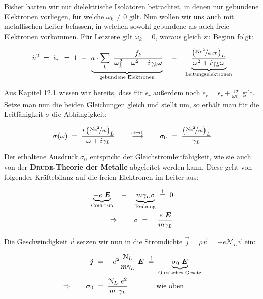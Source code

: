 Bisher hatten wir nur dielektrische Isolatoren betrachtet, in denen nur gebundene Elektronen vorliegen, für welche $\omega_k \neq 0$ gilt. Nun wollen wir uns auch mit metallischen Leiter befassen, in welchen sowohl gebundene als auch freie Elektronen vorkommen. Für Letztere gilt $\omega_k = 0$, woraus gleich zu Beginn folgt:

\begin{equation*}
\tilde{n}^2  \ = \ \tilde{\epsilon}_r  \ = \ 1 \ + \ \underbrace{a\cdot\sum_k \ \frac{f_k}{\omega_k^2 - \omega^2 - i \gamma_k\omega}}_{\text{gebundene Elektronen}} \quad - \quad \underbrace{\frac{\left(\nicefrac{\mathcal{N}e^2}{\epsilon_0m}\right)_L}{\omega^2 + i\gamma_L\omega}}_{\text{Leitungselektronen}}
\end{equation*}

Aus Kapitel 12.1 wissen wir bereits, dass für $\tilde{\epsilon}_r$ außerdem noch $\tilde{\epsilon}_r = \epsilon_r + \frac{i\sigma}{\omega\epsilon_0}$ gilt. Setze man nun die beiden Gleichungen gleich und stellt um, so erhält man für die Leitfähigkeit $\sigma$ die Abhängigkeit:

\begin{equation*}
\sigma(\omega) \ = \ \frac{i\left(\nicefrac{\mathcal{N}e^2}{m}\right)_L}{\omega + i \gamma_L} \qquad \overset{\omega\rightarrow0}{\longrightarrow}\qquad \sigma_0  \ = \ \frac{\left(\nicefrac{\mathcal{N}e^2}{m}\right)_L}{\gamma_L}	
\end{equation*}

Der erhaltene Ausdruck $\sigma_0$ entspricht der Gleichstromleitfähigkeit, wie sie auch von der \textbf{\textsc{Drude}-Theorie der Metalle} abgeleitet werden kann. Diese geht von folgender Kräftebilanz auf die freien Elektronen im Leiter aus:

\begin{align*}
\underbrace{-e\ \vec{E}}_{\textsc{Coulomb}} \quad - \quad \underbrace{m \gamma_L\vec{v}}_{\text{Reibung}}  \ \overset{!}{=} \ 0\\
\Rightarrow \qquad \vec{v}  \ = \  -\frac{e \ \vec{E}}{m \gamma_L} 
\end{align*}

Die Geschwindigkeit $\vec{v}$ setzen wir nun in die Stromdichte $\vec{j} = \rho\vec{v} = -e \mathcal{N}_L \vec{v}$ ein:

\begin{align*}
\vec{j}  \ &= \ -e^2 \frac{\mathcal{N}_L}{m\gamma_L} \ \vec{E} \ \overset{!}{=} \ \underbrace{\sigma_0 \ \vec{E}}_{\text{\textsc{Ohm}'sches Gesetz}}\\
\Rightarrow \qquad \sigma_0  \ &= \ \frac{\mathcal{N}_L \ e^2}{m \ \gamma_L} \qquad\qquad\text{wie oben}
\end{align*}

